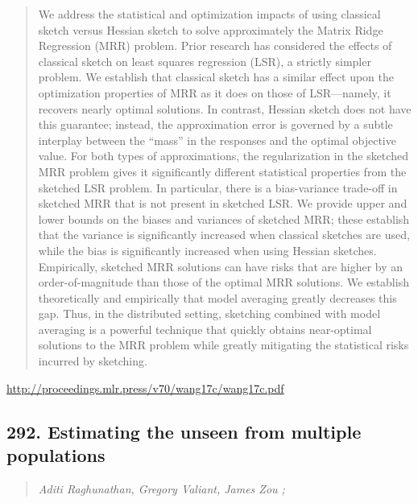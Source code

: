 \documentclass{article}
\begin{document}
\begin{quote}
    We address the statistical and optimization impacts of using classical sketch versus Hessian sketch to solve approximately the Matrix Ridge Regression (MRR) problem. Prior research has considered the effects of classical sketch on least squares regression (LSR), a strictly simpler problem. We establish that classical sketch has a similar effect upon the optimization properties of MRR as it does on those of LSR—namely, it recovers nearly optimal solutions. In contrast, Hessian sketch does not have this guarantee; instead, the approximation error is governed by a subtle interplay between the “mass” in the responses and the optimal objective value. For both types of approximations, the regularization in the sketched MRR problem gives it significantly different statistical properties from the sketched LSR problem. In particular, there is a bias-variance trade-off in sketched MRR that is not present in sketched LSR. We provide upper and lower bounds on the biases and variances of sketched MRR; these establish that the variance is significantly increased when classical sketches are used, while the bias is significantly increased when using Hessian sketches. Empirically, sketched MRR solutions can have risks that are higher by an order-of-magnitude than those of the optimal MRR solutions. We establish theoretically and empirically that model averaging greatly decreases this gap. Thus, in the distributed setting, sketching combined with model averaging is a powerful technique that quickly obtains near-optimal solutions to the MRR problem while greatly mitigating the statistical risks incurred by sketching.  
\end{quote}

\href{http://proceedings.mlr.press/v70/wang17c/wang17c.pdf}{http://proceedings.mlr.press/v70/wang17c/wang17c.pdf}

\subsection{292. Estimating the unseen from multiple populations}

\begin{quote}
\footnotesize{\textit{Aditi Raghunathan, Gregory Valiant, James Zou ;}}

\end{quote}
\end{document}
